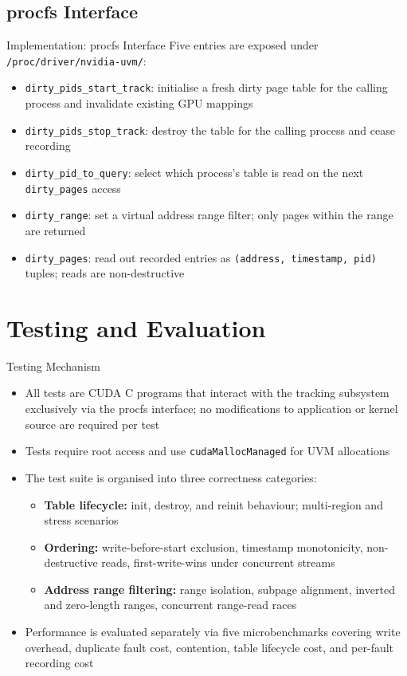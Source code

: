 \documentclass [xcolor=svgnames, t] {beamer}
\begin{document}
\subsection{procfs Interface}
\begin{frame}{Implementation: procfs Interface}
Five entries are exposed under \texttt{/proc/driver/nvidia-uvm/}:
\begin{itemize}
    \item \texttt{dirty\_pids\_start\_track}: initialise a fresh dirty page table for the calling process and invalidate existing GPU mappings
    \item \texttt{dirty\_pids\_stop\_track}: destroy the table for the calling process and cease recording
    \item \texttt{dirty\_pid\_to\_query}: select which process's table is read on the next \texttt{dirty\_pages} access
    \item \texttt{dirty\_range}: set a virtual address range filter; only pages within the range are returned
    \item \texttt{dirty\_pages}: read out recorded entries as \texttt{(address, timestamp, pid)} tuples; reads are non-destructive
\end{itemize}
\end{frame}

\section{Testing and Evaluation}

\begin{frame}{Testing Mechanism}
\begin{itemize}
    \item All tests are CUDA C programs that interact with the tracking subsystem exclusively via the procfs interface; no modifications to application or kernel source are required per test
    \item Tests require root access and use \texttt{cudaMallocManaged} for UVM allocations
    \item The test suite is organised into three correctness categories:
    \begin{itemize}
        \item \textbf{Table lifecycle:} init, destroy, and reinit behaviour; multi-region and stress scenarios
        \item \textbf{Ordering:} write-before-start exclusion, timestamp monotonicity, non-destructive reads, first-write-wins under concurrent streams
        \item \textbf{Address range filtering:} range isolation, subpage alignment, inverted and zero-length ranges, concurrent range-read races
    \end{itemize}
    \item Performance is evaluated separately via five microbenchmarks covering write overhead, duplicate fault cost, contention, table lifecycle cost, and per-fault recording cost
\end{itemize}
\end{frame}
\end{document}
